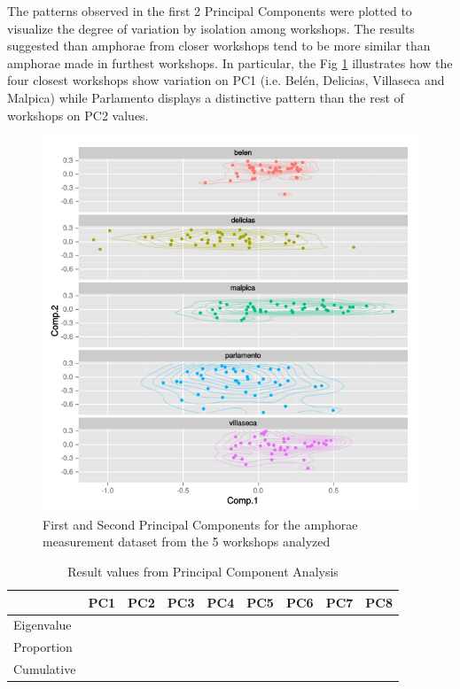 \documentclass[review]{elsarticle}
\begin{document}
The patterns observed in the first 2 Principal Components were plotted to visualize the degree of variation by isolation among workshops. The results suggested than amphorae from closer workshops tend to be more similar than amphorae made in furthest workshops. In particular, the Fig \ref{pca} illustrates how the four closest workshops show variation on PC1 (i.e. Bel\'en, Delicias, Villaseca and Malpica) while Parlamento displays a distinctive pattern than the rest of workshops on PC2 values. 

\begin{figure}[htp]
	\centering
\includegraphics[scale=0.45]{pca.png}
\caption{First and Second Principal Components for the amphorae measurement dataset from the 5 workshops analyzed }
\label{pca}
\end{figure} 


\begin{table}[htp]
\begin{tabular}{lcccccccc}
\hline
      		&  PC1 & PC2	& PC3 & PC4 & PC5 & PC6 & PC7 & PC8     \\ \hline
Eigenvalue  	& 	   &		&	  &  	&	  &	    &     &           \\
Proportion  & 	   &		&	  &   	&	  &	    &     &           \\
Cumulative  &       &    &     &     &     &     &     &           \\

\end{tabular}
\caption{Result values from Principal Component Analysis}
\label{table:spatgeo}
\end{table}
\end{document}
